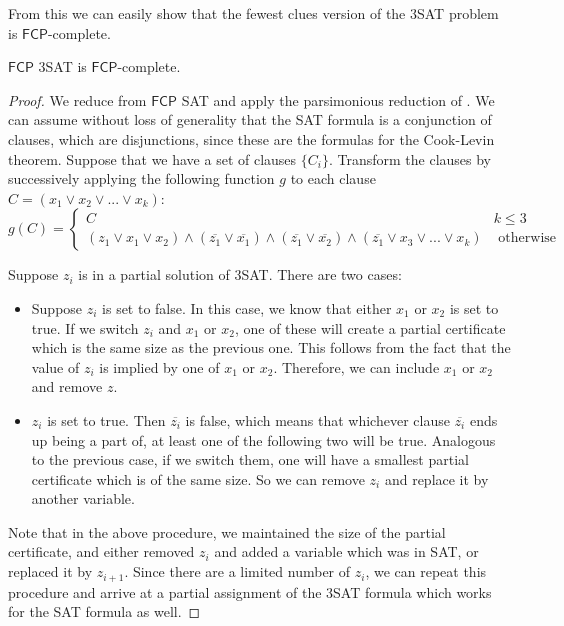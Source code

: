\documentclass[runningheads,a4paper]{llncs}
\begin{document}
From this we can easily show that the fewest clues version of the 3SAT problem is $\mathsf{FCP}$-complete.

\begin{theorem}
$\mathsf{FCP}$ 3SAT is $\mathsf{FCP}$-complete.
\end{theorem}

\begin{proof}
We reduce from $\mathsf{FCP}$ SAT and apply the parsimonious reduction of \cite{yaleclass}. We can assume without loss of generality that the SAT formula is a conjunction of clauses, which are disjunctions, since these are the formulas for the Cook-Levin theorem. Suppose that we have a set of clauses $\{ C_i \}$. Transform the clauses by successively applying the following function $g$ to each clause $C = (x_1 \vee x_2 \vee ... \vee x_k)$:
\[ g(C) = \left\{ \begin{array}{cc} C & k \leq 3 \\
						    (z_1 \vee x_1 \vee x_2) \wedge (\overline{z_1} \vee \overline{x_1}) \wedge (\overline{z_1} \vee \overline{x_2}) \wedge (\overline{z_1} \vee x_3 \vee ... \vee x_k) & \text{ otherwise }\end{array} \right. \] 

Suppose $z_i$ is in a partial solution of 3SAT. There are two cases:
\begin{itemize}
\item Suppose $z_i$ is set to false. In this case, we know that either $x_1$ or $x_2$ is set to true. If we switch $z_i$ and $x_1$ or $x_2$, one of these will create a partial certificate which is the same size as the previous one. This follows from the fact that the value of $z_i$ is implied by one of $x_1$ or $x_2$. Therefore, we can include $x_1$ or $x_2$ and remove $z$.
\item $z_i$ is set to true. Then $\overline{z_i}$ is false, which means that whichever clause $\overline{z_i}$ ends up being a part of, at least one of the following two will be true. Analogous to the previous case, if we switch them, one will have a smallest partial certificate which is of the same size. So we can remove $z_i$ and replace it by another variable. 
\end{itemize}
Note that in the above procedure, we maintained the size of the partial certificate, and either removed $z_i$ and added a variable which was in SAT, or replaced it by $z_{i+1}$. Since there are a limited number of $z_i$, we can repeat this procedure and arrive at a partial assignment of the 3SAT formula which works for the SAT formula as well.
\end{proof}
\end{document}
